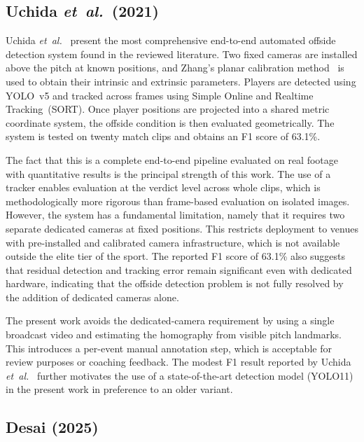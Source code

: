 \subsection{Uchida \textit{et~al.}\ (2021)}%
\label{sec:lit_uchida}

Uchida \textit{et~al.}~\cite{uchida2021offside} present the most comprehensive end-to-end automated offside detection system found in the reviewed literature. Two fixed cameras are installed above the pitch at known positions, and Zhang's planar calibration method~\cite{zhang2000calibration} is used to obtain their intrinsic and extrinsic parameters. Players are detected using YOLO~v5 and tracked across frames using Simple Online and Realtime Tracking~(SORT). Once player positions are projected into a shared metric coordinate system, the offside condition is then evaluated geometrically. The system is tested on twenty match clips and obtains an F1 score of 63.1\%.

The fact that this is a complete end-to-end pipeline evaluated on real footage with quantitative results is the principal strength of this work. The use of a tracker enables evaluation at the verdict level across whole clips, which is methodologically more rigorous than frame-based evaluation on isolated images. However, the system has a fundamental limitation, namely that it requires two separate dedicated cameras at fixed positions. This restricts deployment to venues with pre-installed and calibrated camera infrastructure, which is not available outside the elite tier of the sport. The reported F1 score of 63.1\% also suggests that residual detection and tracking error remain significant even with dedicated hardware, indicating that the offside detection problem is not fully resolved by the addition of dedicated cameras alone.

The present work avoids the dedicated-camera requirement by using a single broadcast video and estimating the homography from visible pitch landmarks. This introduces a per-event manual annotation step, which is acceptable for review purposes or coaching feedback. The modest F1 result reported by Uchida \textit{et~al.}~\cite{uchida2021offside} further motivates the use of a state-of-the-art detection model (YOLO11) in the present work in preference to an older variant.

\subsection{Desai (2025)}%
\label{sec:lit_desai}

